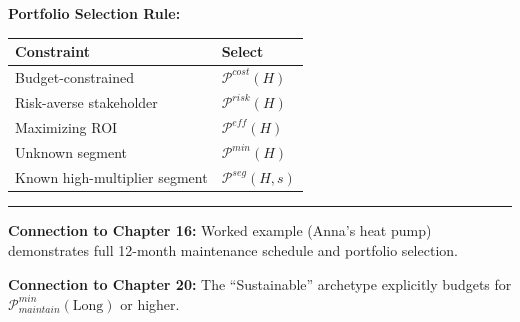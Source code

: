 \begin{tcolorbox}[colback=orange!5!white, colframe=orange!75!black,
    title=\textbf{Method UNTCM-M5: Maintenance Cost Analysis}]
\textbf{Portfolio Selection Rule:}
\begin{center}
\renewcommand{\arraystretch}{1.2}
\begin{tabular}{@{}ll@{}}
\toprule
\textbf{Constraint} & \textbf{Select} \\
\midrule
Budget-constrained & $\mathcal{P}^{cost}(H)$ \\
Risk-averse stakeholder & $\mathcal{P}^{risk}(H)$ \\
Maximizing ROI & $\mathcal{P}^{eff}(H)$ \\
Unknown segment & $\mathcal{P}^{min}(H)$ \\
Known high-multiplier segment & $\mathcal{P}^{seg}(H, s)$ \\
\bottomrule
\end{tabular}
\end{center}

\vspace{0.5em}
\hrule
\vspace{0.5em}

\textbf{Connection to Chapter 16:} Worked example (Anna's heat pump) demonstrates full 12-month maintenance schedule and portfolio selection.

\textbf{Connection to Chapter 20:} The ``Sustainable'' archetype explicitly budgets for $\mathcal{P}_{maintain}^{min}(\text{Long})$ or higher.

\end{tcolorbox}

